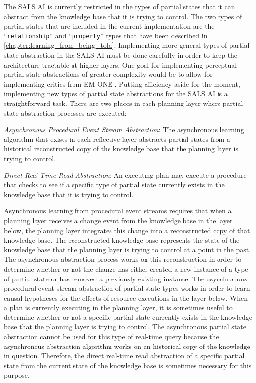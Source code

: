 The SALS AI is currently restricted in the types of partial states
that it can abstract from the knowledge base that it is trying to
control.  The two types of partial states that are included in the
current implementation are the ``{\tt{relationship}}'' and
``{\tt{property}}'' types that have been described in
{\mbox{\autoref{chapter:learning_from_being_told}}}.  Implementing
more general types of partial state abstraction in the SALS AI must be
done carefully in order to keep the architecture tractable at higher
layers.  One goal for implementing perceptual partial state
abstractions of greater complexity would be to allow for implementing
critics from EM-ONE \cite[]{singh:2005b}.  Putting efficiency aside
for the moment, implementing new types of partial state abstractions
for the SALS AI is a straightforward task.  There are two places in
each planning layer where partial state abstraction processes are
executed:
\begin{packed_enumerate}
\item{\emph{Asynchronous Procedural Event Stream Abstraction}: The
  asynchronous learning algorithm that exists in each reflective layer
  abstracts partial states from a historical reconstructed copy of the
  knowledge base that the planning layer is trying to control.}
\item{\emph{Direct Real-Time Read Abstraction}: An executing plan may
  execute a procedure that checks to see if a specific type of partial
  state currently exists in the knowledge base that it is trying to
  control.}
\end{packed_enumerate}
Asynchronous learning from procedural event streams requires that when
a planning layer receives a change event from the knowledge base in
the layer below, the planning layer integrates this change into a
reconstructed copy of that knowledge base.  The reconstructed
knowledge base represents the state of the knowledge base that the
planning layer is trying to control at a point in the past.  The
asynchronous abstraction process works on this reconstruction in order
to determine whether or not the change has either created a new
instance of a type of partial state or has removed a previously
existing instance.  The asynchronous procedural event stream
abstraction of partial state types works in order to learn causal
hypotheses for the effects of resource executions in the layer below.
When a plan is currently executing in the planning layer, it is
sometimes useful to determine whether or not a specific partial state
currently exists in the knowledge base that the planning layer is
trying to control.  The asynchronous partial state abstraction cannot
be used for this type of real-time query because the asynchronous
abstraction algorithm works on an historical copy of the knowledge in
question.  Therefore, the direct real-time read abstraction of a
specific partial state from the current state of the knowledge base is
sometimes necessary for this purpose.

